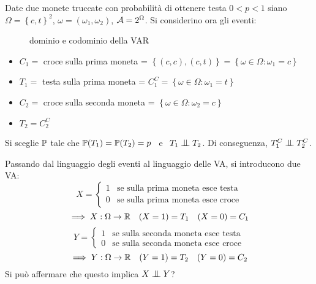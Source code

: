 \medskip
\begin{ese}
  Date due monete truccate con probabilità di ottenere testa $0<p<1$ siano $\Omega =   \left \{ c, t \right \}^2$, $\omega=(\omega_1, \omega_2)$, $\mathcal A = 2^\Omega$.
  Si considerino ora gli eventi:
  \begin{figure}[ht]
    \centering
    \caption{dominio e codominio della VAR}
    \label{dom-cod-var}
  \end{figure}
  \begin{itemize}
    \item $C_1 =$ croce sulla prima moneta = $\left \{ (c,c) , (c,t) \right \}=\left \{ \omega \in \Omega : \omega_1=c \right \} $
    \item $T_1 =$ testa sulla prima moneta = $C_1^C= \left \{\omega \in \Omega : \omega_1=t \right \} $
    \item $C_2 =$ croce sulla seconda moneta = $ \left \{\omega \in \Omega : \omega_2=c \right \} $
    \item $T_2= C_2^C$
  \end{itemize}
  Si sceglie $\mathbb P$ tale che $\mathbb P(T_1)=\mathbb P(T_2)=p \enspace$ e $\enspace T_1 \indep T_2$. Di conseguenza, $T_1^C \indep T_2^C$.

  Passando dal linguaggio degli eventi al linguaggio delle VA, si introducono due VA:\\[-4pt]
  $$X= \begin{cases} 1 & \text{se sulla prima moneta esce testa} \\ 0 & \text{se sulla prima moneta esce croce} \end{cases}$$
  $$\implies X:\Omega \to \mathbb R \ \ \  (X=1)=T_1 \ \ \ (X=0)=C_1$$
  $$Y= \begin{cases} 1 & \text{se sulla seconda moneta esce testa} \\ 0 & \text{se sulla seconda moneta esce croce} \end{cases}$$
  $$\implies Y:\Omega \to \RR \ \ \ (Y=1)=T_2 \ \ \ (Y=0)=C_2$$
  Si può affermare che questo implica $X \indep Y$?


\end{ese}
